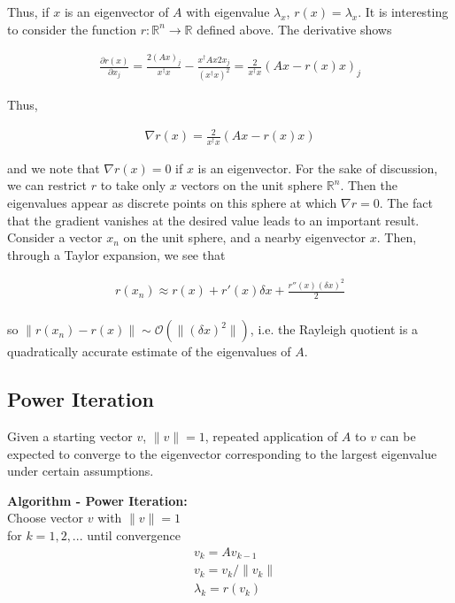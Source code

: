 \documentclass[11pt]{article}
\newcommand{\R}{\mathbb{R}}
\newcommand{\Rn}{\mathbb{R}^{n}}
\begin{document}
Thus, if $x$ is an eigenvector of $A$ with eigenvalue $\lambda_x$, $r(x) = \lambda_x$. It is interesting to consider the function $r: \Rn \rightarrow \R$ defined above. The derivative shows

\begin{align*}
  \frac{\partial r(x)}{\partial x_j} = \frac{2 (Ax)_j}{x^\dagger x} - \frac{x^\dagger A x 2 x_j}{(x^\dagger x)^2} = \frac{2}{x^\dagger x}( Ax - r(x)x)_j
\end{align*}

Thus, 

\begin{align*}
  \nabla r(x) = \frac{2}{x^\dagger x}( Ax - r(x)x)
\end{align*}

and we note that $\nabla r(x) = 0$ if $x$ is an eigenvector. For the sake of discussion, we can restrict $r$ to take only $x$ vectors on the unit sphere $\Rn$. Then the eigenvalues appear as discrete points on this sphere at which $\nabla r = 0$. The fact that the gradient vanishes at the desired value leads to an important result. Consider a vector $x_n$ on the unit sphere, and a nearby eigenvector $x$. Then, through a Taylor expansion, we see that

\begin{align*}
  r(x_n) \approx r(x) + r'(x) \delta x + \frac{r''(x) (\delta x)^2}{2} \\
\end{align*}

so $\|r(x_n) - r(x)\| \sim \mathcal{O}(\|(\delta x)^2\|)$, i.e. the Rayleigh quotient is a quadratically accurate estimate of the eigenvalues of $A$. 

\subsection{Power Iteration}

Given a starting vector $v$, $\| v \| = 1$, repeated application of $A$ to $v$ can be expected to converge to the eigenvector corresponding to the largest eigenvalue under certain assumptions.

\begin{framed}
\textbf{Algorithm - Power Iteration:} \\
\hspace{5mm} Choose vector $v$ with $\| v \| = 1$ \\
\hspace{5mm} for $k=1,2,...$ until convergence \\
\begin{align*}
  &v_k = A v_{k-1} \\
  &v_k = v_k / \|v_k \| \\
  &\lambda_k = r(v_k) \\
\end{align*}
\end{framed}
\end{document}
